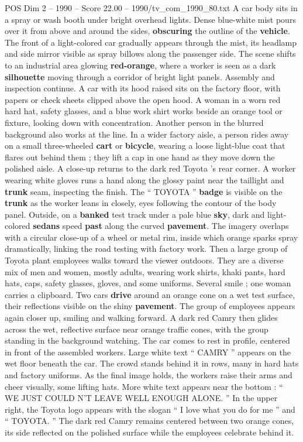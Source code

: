 \begin{textsample}{POS Dim 2 – 1990 – Score 22.00 – 1990/tv\_com\_1990\_80.txt}
A car body sits in a spray or wash booth under bright overhead lights.
Dense blue-white mist pours over it from above and around the sides, \textbf{obscuring} the outline of the \textbf{vehicle}.
The front of a light-colored car gradually appears through the mist, its headlamp and side mirror visible as spray billows along the passenger side.
The scene shifts to an industrial area glowing \textbf{red-orange}, where a worker is seen as a dark \textbf{silhouette} moving through a corridor of bright light panels.
Assembly and inspection continue.
A car with its hood raised sits on the factory floor, with papers or check sheets clipped above the open hood.
A woman in a worn red hard hat, safety glasses, and a blue work shirt works beside an orange tool or fixture, looking down with concentration.
Another person in the blurred background also works at the line.
In a wider factory aisle, a person rides away on a small three-wheeled \textbf{cart} or \textbf{bicycle}, wearing a loose light-blue coat that flares out behind them ; they lift a cap in one hand as they move down the polished aisle.
A close-up returns to the dark red Toyota ’s rear corner.
A worker wearing white gloves runs a hand along the glossy paint near the taillight and \textbf{trunk} seam, inspecting the finish.
The “ TOYOTA ” \textbf{badge} is visible on the \textbf{trunk} as the worker leans in closely, eyes following the contour of the body panel.
Outside, on a \textbf{banked} test track under a pale blue \textbf{sky}, dark and light-colored \textbf{sedans} speed \textbf{past} along the curved \textbf{pavement}.
The imagery overlaps with a circular close-up of a wheel or metal rim, inside which orange sparks spray dramatically, linking the road testing with factory work.
Then a large group of Toyota plant employees walks toward the viewer outdoors.
They are a diverse mix of men and women, mostly adults, wearing work shirts, khaki pants, hard hats, caps, safety glasses, gloves, and some uniforms.
Several smile ; one woman carries a clipboard.
Two cars \textbf{drive} around an orange cone on a wet test surface, their reflections visible on the shiny \textbf{pavement}.
The group of employees appears again closer up, smiling and walking forward.
A dark red Camry then glides across the wet, reflective surface near orange traffic cones, with the group standing in the background watching.
The car comes to rest in profile, centered in front of the assembled workers.
Large white text “ CAMRY ” appears on the wet floor beneath the car.
The crowd stands behind it in rows, many in hard hats and factory uniforms.
As the final image holds, the workers raise their arms and cheer visually, some lifting hats.
More white text appears near the bottom : “ WE JUST COULD N’T LEAVE WELL ENOUGH ALONE. ” In the upper right, the Toyota logo appears with the slogan “ I love what you do for me ” and “ TOYOTA. ” The dark red Camry remains centered between two orange cones, its side reflected on the polished surface while the employees celebrate behind it.

\end{textsample}
